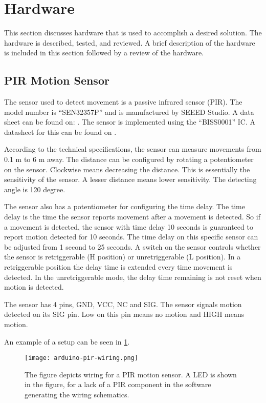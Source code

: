 \section{Hardware}
This section discusses hardware that is used to accomplish a desired solution.  The hardware is described, tested, and reviewed. A brief description of the hardware is included in this section followed by a review of the hardware.

\subsection{PIR Motion Sensor}

The sensor used to detect movement is a passive infrared sensor (PIR). The model
number is \enquote{SEN32357P} and is manufactured by SEEED Studio. A data sheet
can be found on:
\cite{datasheet_pir1}. The
sensor is implemented using the \enquote{BISS0001} IC. A datasheet for this can
be found on \cite{datasheet_pir2}.

According to the technical specifications, the sensor can measure movements from 0.1 m to 6
m away. The distance can be configured by rotating a potentiometer on the
sensor. Clockwise means decreasing the distance. This is essentially the
sensitivity of the sensor. A lesser distance means lower sensitivity. The detecting angle is 120 degree.

The sensor also has a potentiometer for configuring the time delay. The time
delay is the time the sensor reports movement after a movement is detected. So
if a movement is detected, the sensor with time delay 10 seconds is guaranteed
to report motion detected for 10 seconds. The time delay on this specific sensor
can be adjusted from 1 second to 25 seconds. A switch on the sensor controls
whether the sensor is retriggerable (H position) or unretriggerable (L
position). In a retriggerable position the delay time is extended every time
movement is detected. In the unretriggerable mode, the delay time remaining is
not reset when motion is detected.

The sensor has 4 pins, GND, VCC, NC and SIG. The sensor signals motion detected
on its SIG pin. Low on this pin means no motion and HIGH means motion.

An example of a setup can be seen in \cref{fig:arduino_pir_wiring}.

\begin{figure}[htbp]
  \centering
  \texttt{[image: arduino-pir-wiring.png]}
  \caption{The figure depicts wiring for a PIR motion sensor. A LED is shown in
    the figure, for a lack of a PIR component in the software generating the
    wiring schematics.}
  \label{fig:arduino_pir_wiring}
\end{figure}

